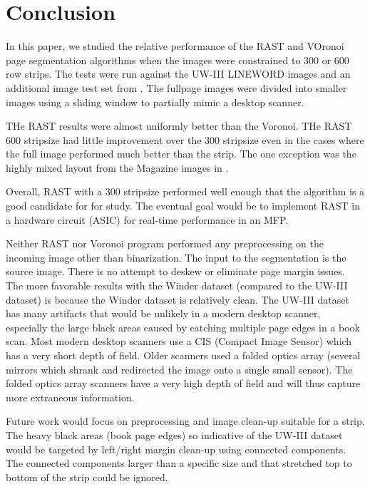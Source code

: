 \documentclass[conference]{IEEEtran}
\begin{document}
\section{Conclusion}

In this paper, we studied the relative performance of the RAST and VOronoi page
segmentation algorithms when the images were constrained to 300 or 600 row
strips. The tests were run against the UW-III LINEWORD images and an additional
image test set from \cite{IEEEhowto:Winder}. The fullpage images were divided
into smaller images using a sliding window to partially mimic a desktop
scanner.

THe RAST results were almost uniformly better than the Voronoi. THe RAST 600
stripsize had little improvement over the 300 stripsize even in the cases where
the full image performed much better than the strip. The one exception was the
highly mixed layout from the Magazine images in \cite{IEEEhowto:Winder}.

Overall, RAST with a 300 stripsize performed well enough that the algorithm is
a good candidate for for study. The eventual goal would be to implement RAST in
a hardware circuit (ASIC) for real-time performance in an MFP.

Neither RAST nor Voronoi program performed any preprocessing on the incoming
image other than binarization. The input to the segmentation is the source
image. There is no attempt to deskew or eliminate page margin issues. The more
favorable results with the Winder dataset (compared to the UW-III dataset) is
because the Winder dataset is relatively clean. The UW-III dataset has many
artifacts that would be unlikely in a modern desktop scanner, especially the
large black areas caused by catching multiple page edges in a book scan. Most
modern desktop scanners use a CIS (Compact Image Sensor) which has a very short
depth of field. Older scanners used a folded optics array (several mirrors
which shrank and redirected the image onto a single small sensor). The
folded optics array scanners have a very high depth of field and will thus
capture more extraneous information.

Future work would focus on preprocessing and image clean-up suitable for a
strip. The heavy black areas (book page edges) so indicative of the UW-III
dataset would be targeted by left/right margin clean-up using connected
components. The connected components larger than a specific size and that
stretched top to bottom of the strip could be ignored.

\end{document}

